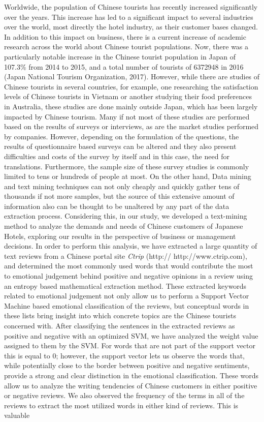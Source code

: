 \documentclass[review]{elsarticle}
\begin{document}
Worldwide, the population of Chinese tourists has recently increased significantly over the years. This increase has led to a significant impact to several industries over the world, most directly the hotel industry, as their customer bases changed. In addition to this impact on business, there is a current increase of academic research across the world about Chinese tourist populations\cite[][]{sun2017}. Now, there was a particularly notable increase in the Chinese tourist population in Japan of 107.3\% from 2014 to 2015, and a total number of tourists of \num[group-separator={,}]{6372948} in 2016 (Japan National Tourism Organization, 2017). However, while there are studies of Chinese tourists in several countries, for example, one researching the satisfaction levels of Chinese tourists in Vietnam\cite[][]{truong2009} or another studying their food preferences in Australia\cite[][]{chang2010}, these studies are done mainly outside Japan, which has been largely impacted by Chinese tourism. Many if not most of these studies are performed based on the results of surveys or interviews, as are the market studies performed by companies. However, depending on the formulation of the questions, the results of questionnaire based surveys can be altered and they also present difficulties and costs of the survey by itself and in this case, the need for translations. Furthermore, the sample size of these survey studies is commonly limited to tens or hundreds of people at most. On the other hand, Data mining and text mining techniques can not only cheaply and quickly gather tens of thousands if not more samples, but the source of this extensive amount of information also can be thought to be unaltered by any part of the data extraction process. Considering this, in our study, we developed a text-mining method to analyze the demands and needs of Chinese customers of Japanese Hotels, exploring our results in the perspective of business or management decisions. In order to perform this analysis, we have extracted a large quantity of text reviews from a Chinese portal site \textit{Ctrip} (http:// http://www.ctrip.com), and determined the most commonly used words that would contribute the most to emotional judgement behind positive and negative opinions in a review using an entropy based mathematical extraction method. These extracted keywords related to emotional judgement not only allow us to perform a Support Vector Machine based emotional classification of the reviews, but conceptual words in these lists bring insight into which concrete topics are the Chinese tourists concerned with. After classifying the sentences in the extracted reviews as positive and negative with an optimized SVM, we have analyzed the weight value assigned to them by the SVM. For words that are not part of the support vector this is equal to 0; however, the support vector lets us observe the words that, while potentially close to the border between positive and negative sentiments, provide a strong and clear distinction in the emotional classification. These words allow us to analyze the writing tendencies of Chinese customers in either positive or negative reviews. We also observed the frequency of the terms in all of the reviews to extract the most utilized words in either kind of reviews. This is valuable 
\end{document}

